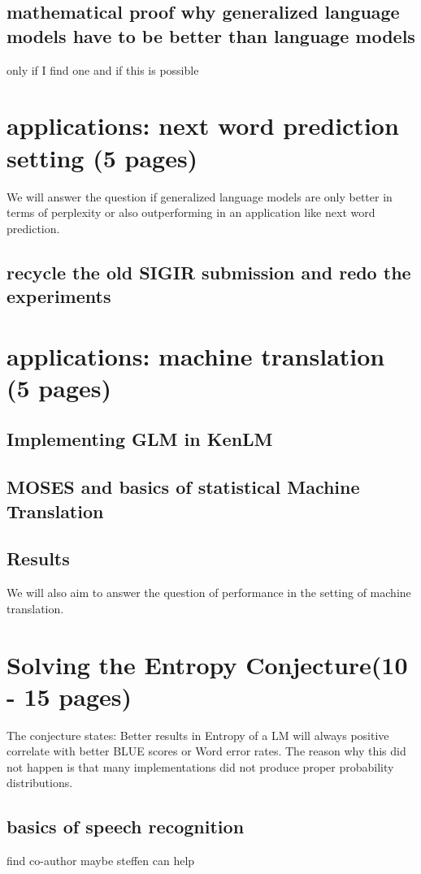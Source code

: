 \documentclass[•]{book}
\begin{document}
\section{mathematical proof why generalized language models have to be better than language models}
only if I find one and if this is possible



\chapter{applications: next word prediction setting (5 pages)}
We will answer the question if generalized language models are only better in terms of perplexity or also outperforming in an application like next word prediction.
\section{recycle the old SIGIR submission and redo the experiments}

\chapter{applications: machine translation (5 pages)}
\section{Implementing GLM in KenLM}
\section{MOSES and basics of statistical Machine Translation}
\section{Results}
We will also aim to answer the question of performance in the setting of machine translation.


\chapter{Solving the Entropy Conjecture(10 - 15 pages)}
The conjecture states: Better results in Entropy of a LM will always positive correlate with better BLUE scores or Word error rates. The reason why this did not happen is that many implementations did not produce proper probability distributions.
\section{basics of speech recognition}
find co-author maybe steffen can help
\end{document}
